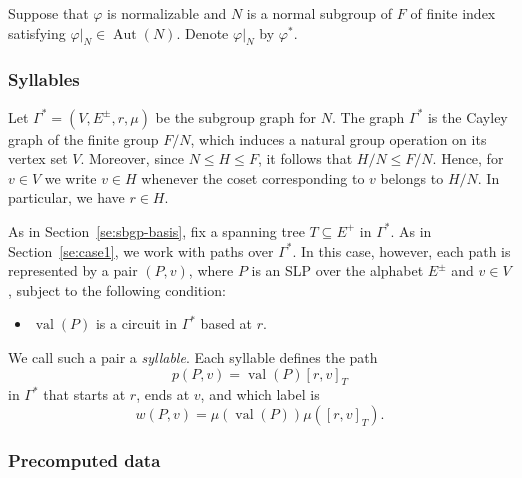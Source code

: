 \documentclass[12pt,oneside]{amsart}
\theoremstyle{definition}
\theoremstyle{case}
\DeclareMathOperator{\Aut}{{Aut}}
\DeclareMathOperator{\val}{val}
\begin{document}
Suppose that $\varphi$ is normalizable and $N$ is a normal subgroup of $F$
of finite index satisfying $\varphi|_N \in \Aut(N)$. Denote $\varphi|_N$
by $\varphi^\ast$.


\subsubsection{Syllables}

Let $\Gamma^\ast=(V,E^\pm,r,\mu)$ be the subgroup graph for $N$.
The graph $\Gamma^\ast$ is the Cayley graph of the finite group $F/N$,
which induces a natural group operation on its vertex set $V$.
Moreover, since $N\le H\le F$, it follows that $H/N\le F/N$.
Hence, for $v\in V$ we write $v\in H$ 
whenever the coset corresponding to $v$ belongs to $H/N$.
In particular, we have $r\in H$.


As in Section~\ref{se:sbgp-basis}, fix a spanning tree
$T\subseteq E^+$ in $\Gamma^\ast$.
As in Section~\ref{se:case1}, we work with paths over $\Gamma^\ast$.
In this case, however, each path is represented by a pair $(P, v)$, 
where $P$ is an SLP over the alphabet $E^\pm$ and $v \in V$,
subject to the following condition:
\begin{itemize}
\item 
$\val(P)$ is a circuit in $\Gamma^\ast$ based at $r$.
\end{itemize}
We call such a pair a \emph{syllable}. Each syllable defines the path 
$$
p(P,v) = \val(P) [r,v]_T
$$
in $\Gamma^\ast$ that starts at $r$, ends at $v$, and which label is
$$
w(P,v) = \mu(\val(P)) \mu([r,v]_T).
$$

\subsubsection{Precomputed data}
\end{document}
